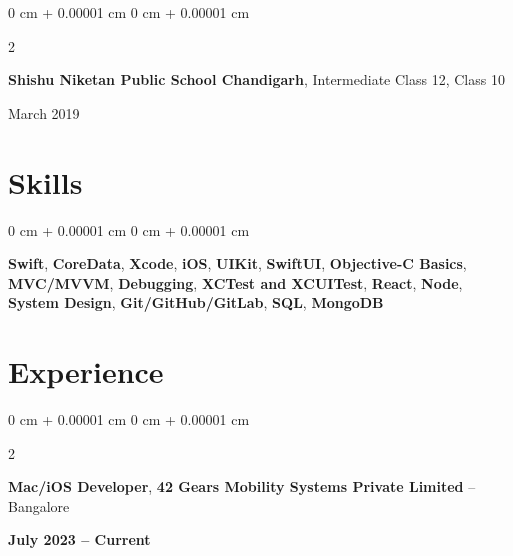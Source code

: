 \documentclass[10pt, letterpaper]{article}
\newenvironment{onecolentry}{
    \begin{adjustwidth}{
        0 cm + 0.00001 cm
    }{
        0 cm + 0.00001 cm
    }
}{
    \end{adjustwidth}
} %
\newenvironment{twocolentry}[2][]{
    \onecolentry
    \def\secondColumn{#2}
    \setcolumnwidth{\fill, 4.5 cm}
    \begin{paracol}{2}
}{
    \switchcolumn \raggedleft \secondColumn
    \end{paracol}
    \endonecolentry
} %
\begin{document}
        \vspace{0.10 cm}
        \begin{twocolentry}{
            March 2019
        }
            \textbf{Shishu Niketan Public School Chandigarh}, Intermediate Class 12, Class 10
        \end{twocolentry}

        \vspace{0.2 cm}

    \section{Skills}

    \begin{onecolentry}
        \textbf{Swift}, \hspace{0.2cm} \textbf{CoreData}, \hspace{0.2cm} \textbf{Xcode}, \hspace{0.2cm} \textbf{iOS}, \hspace{0.2cm} \textbf{UIKit}, \hspace{0.2cm} \textbf{SwiftUI}, \hspace{0.2cm} \textbf{Objective-C Basics}, \hspace{0.2cm} \textbf{MVC/MVVM}, \hspace{0.2cm} \hspace{0.2cm} \textbf{Debugging}, \hspace{0.2cm} \textbf{XCTest and XCUITest}, \hspace{0.2cm} \textbf{React}, \hspace{0.2cm} \textbf{Node}, \hspace{0.2cm} \textbf{System Design}, \hspace{0.2cm} \textbf{Git/GitHub/GitLab}, \hspace{0.2cm} \textbf{SQL}, \hspace{0.2cm} \textbf{MongoDB}
    \end{onecolentry}

    \vspace{0.2 cm}

    \section{Experience}



        
        \begin{twocolentry}{
            \textbf{July 2023 – Current}
        }
            \textbf{Mac/iOS Developer}, \textbf{42 Gears Mobility Systems Private Limited} -- Bangalore
        \end{twocolentry}
\end{document}
